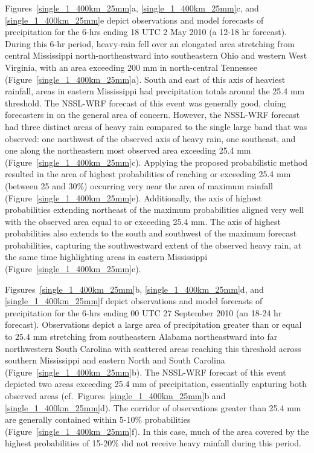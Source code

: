 \mbox{Figures \ref{single_1_400km_25mm}a}, \mbox{\ref{single_1_400km_25mm}c}, and \mbox{\ref{single_1_400km_25mm}e} depict observations and model forecasts of precipitation for the 6-hrs ending 18 UTC 2 May 2010 (a 12-18 hr forecast).
During this 6-hr period, heavy-rain fell over an elongated area stretching from central Mississippi north-northeastward into southeastern Ohio and western West Virginia, with an area exceeding 200 mm in north-central Tennessee \mbox{(Figure \ref{single_1_400km_25mm}a)}.
South and east of this axis of heaviest rainfall, areas in eastern Mississippi had precipitation totals around the 25.4 mm threshold.
The NSSL-WRF forecast of this event was generally good, cluing forecasters in on the general area of concern.
However, the NSSL-WRF forecast had three distinct areas of heavy rain compared to the single large band that was observed: one northwest of the observed axis of heavy rain, one southeast, and one along the northeastern most observed area exceeding 25.4 mm \mbox{(Figure \ref{single_1_400km_25mm}c)}.
Applying the proposed probabilistic method resulted in the area of highest probabilities of reaching or exceeding 25.4 mm (between 25 and 30\%) occurring very near the area of maximum rainfall \mbox{(Figure \ref{single_1_400km_25mm}e)}.
Additionally, the axis of highest probabilities extending northeast of the maximum probabilities aligned very well with the observed area equal to or exceeding 25.4 mm.
The axis of highest probabilities also extends to the south and southwest of the maximum forecast probabilities, capturing the southwestward extent of the observed heavy rain, at the same time highlighting areas in eastern Mississippi \mbox{(Figure \ref{single_1_400km_25mm}e)}.


\mbox{Figsures \ref{single_1_400km_25mm}b}, \mbox{\ref{single_1_400km_25mm}d}, and \mbox{\ref{single_1_400km_25mm}f} depict observations and model forecasts of precipitation for the 6-hrs ending 00 UTC 27 September 2010 (an 18-24 hr forecast).
Observations depict a large area of precipitation greater than or equal to 25.4 mm stretching from southeastern Alabama northeastward into far northwestern South Carolina with scattered areas reaching this threshold across southern Mississippi and eastern North and South Carolina \mbox{(Figure \ref{single_1_400km_25mm}b)}.
The NSSL-WRF forecast of this event depicted two areas exceeding 25.4 mm of precipitation, essentially capturing both observed areas (\mbox{cf. Figures \ref{single_1_400km_25mm}b} and \mbox{\ref{single_1_400km_25mm}d)}.
The corridor of observations greater than 25.4 mm are generally contained within 5-10\% probabilities \mbox{(Figure \ref{single_1_400km_25mm}f)}. In this case, much of the area covered by the highest probabilities of 15-20\% did not receive heavy rainfall during this period.


